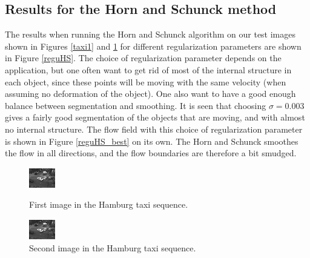 \documentclass[10pt,a4paper]{article}
\begin{document}
\subsection{Results for the Horn and Schunck method}
The results when running the Horn and Schunck algorithm on our test images shown in Figures \ref{taxi1} and \ref{taxi2} for different regularization parameters are shown in Figure \ref{reguHS}. The choice of regularization parameter depends on the application, but one often want to get rid of most of the internal structure in each object, since these points will be moving with the same velocity (when assuming no deformation of the object). One also want to have a good enough balance between segmentation and smoothing. It is seen that choosing $\sigma = 0.003$ gives a fairly good segmentation of the objects that are moving, and with almost no internal structure. The flow field with this choice of regularization parameter is shown in Figure \ref{reguHS_best} on its own. The Horn and Schunck smoothes the flow in all directions, and the flow boundaries are therefore a bit smudged. 


\begin{figure}
\centering
\begin{minipage}{0.45\textwidth}
\centering
\includegraphics[scale=9]{taxi-00}
\caption{First image in the Hamburg taxi sequence.}
\label{taxi1}
\end{minipage}\hfill
\begin{minipage}{0.45\textwidth}
\centering
\includegraphics[scale=9]{taxi-01}
\caption{Second image in the Hamburg taxi sequence.}
\label{taxi2}
\end{minipage}
\end{figure}
\end{document}
